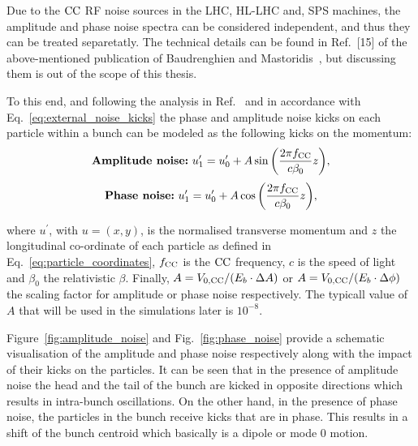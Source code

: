 Due to the ${\mathrm{CC}}$ RF noise sources in the LHC, HL-LHC and, SPS machines, the amplitude and phase noise spectra can be considered  independent, and thus they can be treated separetatly. The technical details can be found in Ref.~[15] of the above-mentioned publication of Baudrenghien and Mastoridis~\cite{PhysRevSTAB.18.101001}, but discussing them is out of the scope of this thesis.

To this end, and following the analysis in Ref.~\cite{PhysRevSTAB.18.101001} and in accordance with Eq.~\eqref{eq:external_noise_kicks} the phase and amplitude noise kicks on each particle within a bunch can be modeled as the following kicks on the momentum: %
\begin{equation}\label{eq:amplitude_noise_kick}
  \textbf{\textrm{Amplitude noise:}} \  u^\prime_1 =  u^\prime_0 + A \sin{\left (  \frac{2 \pi {f_\mathrm{CC}}}{c \beta_0}z   \right )},
\end{equation}
\begin{equation}\label{eq:phase_noise_kick}
    \textbf{\textrm{Phase noise:}} \ u^\prime_1 =  u^\prime_0 + A \cos{\left (  \frac{2 \pi {f_\mathrm{CC}}}{c \beta_0}z   \right )},
\end{equation}

where $u^\prime$, with $u=(x,y)$, is the normalised transverse momentum and $z$ the longitudinal co-ordinate of each particle as defined in Eq.~\eqref{eq:particle_coordinates}, ${f_\mathrm{CC}}$ is the ${\mathrm{CC}}$ frequency, $c$ is the speed of light and $\beta_0$ the relativistic $\beta$. Finally, $A={V_\mathrm{0, CC}} /(E_b \cdot \Delta A )$ or $A={V_\mathrm{0, CC}} /(E_b \cdot \Delta \phi )$ the scaling factor for amplitude or phase noise respectively. The typicall value of $A$ that will be used in the simulations later is $10^{-8}$.

Figure~\ref{fig:amplitude_noise} and Fig.~\ref{fig:phase_noise} provide a schematic visualisation of the amplitude and phase noise respectively along with the impact of their kicks on the particles. It can be seen that in the presence of amplitude noise the head and the tail of the bunch are kicked in opposite directions which results in intra-bunch oscillations. On the other hand, in the presence of phase noise, the particles in the bunch receive kicks that are in phase. This results in a shift of the bunch centroid which basically is a dipole or mode 0 motion.

